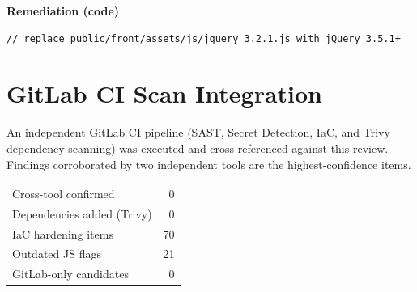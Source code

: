 \documentclass[11pt,a4paper]{article}
\begin{document}
\vspace{4pt}\noindent\textbf{Remediation (code)}\par
\begin{lstlisting}
// replace public/front/assets/js/jquery_3.2.1.js with jQuery 3.5.1+
\end{lstlisting}

\clearpage\section*{GitLab CI Scan Integration}
An independent GitLab CI pipeline (SAST, Secret Detection, IaC, and Trivy dependency scanning) was executed and cross-referenced against this review. Findings corroborated by two independent tools are the highest-confidence items.\par\vspace{4pt}
{\renewcommand{\arraystretch}{1.35}%
\begin{tabularx}{\textwidth}{L R}
\toprule
Cross-tool confirmed & 0 \\
Dependencies added (Trivy) & 0 \\
IaC hardening items & 70 \\
Outdated JS flags & 21 \\
GitLab-only candidates & 0 \\
\bottomrule
\end{tabularx}}
\end{document}

